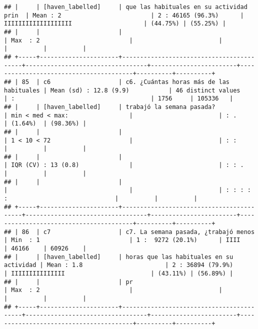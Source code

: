 \documentclass[]{article}
\begin{document}
\begin{verbatim}
## |     | [haven_labelled]     | que las habituales en su actividad prin  | Mean : 2                         | 2 : 46165 (96.3%)      | IIIIIIIIIIIIIIIIIII                    | (44.75%) | (55.25%) |
## |     |                      |                                          | Max  : 2                         |                        |                                        |          |          |
## +-----+----------------------+------------------------------------------+----------------------------------+------------------------+----------------------------------------+----------+----------+
## | 85  | c6                   | c6. ¿Cuántas horas más de las habituales | Mean (sd) : 12.8 (9.9)           | 46 distinct values     | :                                      | 1756     | 105336   |
## |     | [haven_labelled]     | trabajó la semana pasada?                | min < med < max:                 |                        | : .                                    | (1.64%)  | (98.36%) |
## |     |                      |                                          | 1 < 10 < 72                      |                        | : :                                    |          |          |
## |     |                      |                                          | IQR (CV) : 13 (0.8)              |                        | : : .                                  |          |          |
## |     |                      |                                          |                                  |                        | : : : : :                              |          |          |
## +-----+----------------------+------------------------------------------+----------------------------------+------------------------+----------------------------------------+----------+----------+
## | 86  | c7                   | c7. La semana pasada, ¿trabajó menos     | Min  : 1                         | 1 :  9272 (20.1%)      | IIII                                   | 46166    | 60926    |
## |     | [haven_labelled]     | horas que las habituales en su actividad | Mean : 1.8                       | 2 : 36894 (79.9%)      | IIIIIIIIIIIIIII                        | (43.11%) | (56.89%) |
## |     |                      | pr                                       | Max  : 2                         |                        |                                        |          |          |
## +-----+----------------------+------------------------------------------+----------------------------------+------------------------+----------------------------------------+----------+----------+

\end{verbatim}
\end{document}
